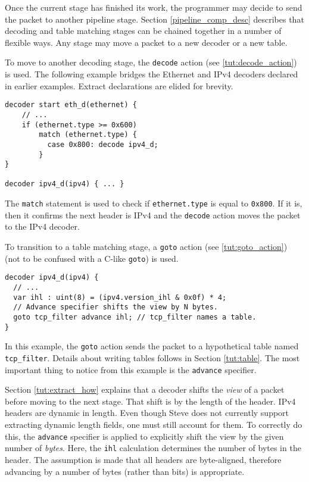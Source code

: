 Once the current stage has finished its work, the programmer may decide
to send the packet to another pipeline stage.
Section \ref{pipeline_comp_desc} describes that decoding and
table matching stages can be chained together in a number of flexible ways.
Any stage may move a packet to a new decoder or a new table.

To move to another decoding stage, the \texttt{decode} action (see \ref{tut:decode_action})
is used. The following example bridges the Ethernet and IPv4 decoders
declared in earlier examples. Extract declarations are elided for
brevity.

\begin{codepage}
\begin{lstlisting}
decoder start eth_d(ethernet) {
	// ...
	if (ethernet.type >= 0x600)
	    match (ethernet.type) {
	      case 0x800: decode ipv4_d;
	    }
}

decoder ipv4_d(ipv4) { ... }
\end{lstlisting}
\end{codepage}

The \texttt{match} statement is used to check if \texttt{ethernet.type} is equal to
\texttt{0x800}. If it is, then it confirms the next header is IPv4 and the \texttt{decode} action moves the packet to the IPv4 decoder.

To transition to a table matching stage, a \texttt{goto} action (see \ref{tut:goto_action}) (not
to be confused with a C-like \texttt{goto}) is used.

\begin{codepage}
\begin{lstlisting}
decoder ipv4_d(ipv4) {
  // ...
  var ihl : uint(8) = (ipv4.version_ihl & 0x0f) * 4;
  // Advance specifier shifts the view by N bytes.
  goto tcp_filter advance ihl; // tcp_filter names a table.
}
\end{lstlisting}
\end{codepage}

In this example, the \texttt{goto} action sends the packet to a hypothetical table
named \texttt{tcp\_filter}. Details about writing tables follows in Section \ref{tut:table}. 
The most important thing to notice from this example is the
\texttt{advance} specifier.

Section \ref{tut:extract_how} explains that a decoder shifts the
\textit{view} of a packet before moving to the next stage. That shift is by the
length of the header. IPv4 headers are dynamic in length. Even though Steve does not
currently support extracting dynamic length fields, one must still account for
them. To correctly do this, the \texttt{advance} specifier is applied to
explicitly shift the view by the given number of \textit{bytes}. 
Here, the \texttt{ihl} calculation determines the number of bytes in the header.
The assumption is made that all headers are byte-aligned, therefore advancing by
a number of bytes (rather than bits) is appropriate. 

